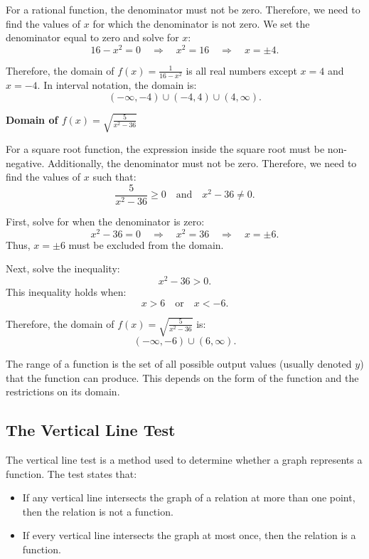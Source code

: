 For a rational function, the denominator must not be zero. Therefore, we need to find the values of \( x \) for which the denominator is not zero. We set the denominator equal to zero and solve for \( x \):
\[
16 - x^2 = 0 \quad \Rightarrow \quad x^2 = 16 \quad \Rightarrow \quad x = \pm 4.
\]

Therefore, the domain of \( f(x) = \frac{1}{16 - x^2} \) is all real numbers except \( x = 4 \) and \( x = -4 \). In interval notation, the domain is:
\[
\boxed{(-\infty, -4) \cup (-4, 4) \cup (4, \infty)}.
\]

\textbf{Domain of \( f(x) = \sqrt{\frac{5}{x^2 - 36}} \)}

For a square root function, the expression inside the square root must be non-negative. Additionally, the denominator must not be zero. Therefore, we need to find the values of \( x \) such that:
\[
\frac{5}{x^2 - 36} \geq 0 \quad \text{and} \quad x^2 - 36 \neq 0.
\]

First, solve for when the denominator is zero:
\[
x^2 - 36 = 0 \quad \Rightarrow \quad x^2 = 36 \quad \Rightarrow \quad x = \pm 6.
\]
Thus, \( x = \pm 6 \) must be excluded from the domain.

Next, solve the inequality:
\[
x^2 - 36 > 0.
\]
This inequality holds when:
\[
x > 6 \quad \text{or} \quad x < -6.
\]

Therefore, the domain of \( f(x) = \sqrt{\frac{5}{x^2 - 36}} \) is:
\[
\boxed{(-\infty, -6) \cup (6, \infty)}.
\]



\begin{definition}

The range of a function is the set of all possible output values (usually denoted \( y \)) that the function can produce. This depends on the form of the function and the restrictions on its domain.

\end{definition}

\subsection{The Vertical Line Test}

The vertical line test is a method used to determine whether a graph represents a function. The test states that:
\begin{itemize}
    \item If any vertical line intersects the graph of a relation at more than one point, then the relation is not a function.
    \item If every vertical line intersects the graph at most once, then the relation is a function.
\end{itemize}

